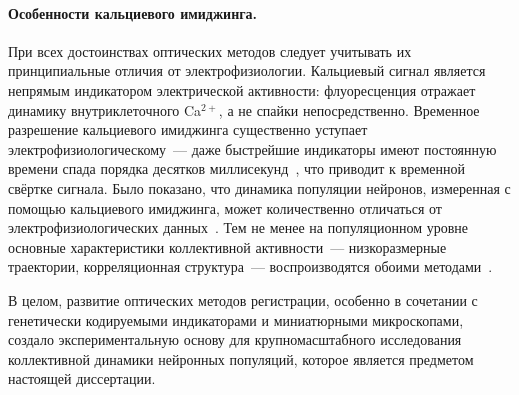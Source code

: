 \paragraph{Особенности кальциевого имиджинга.}
При всех достоинствах оптических методов следует учитывать их принципиальные отличия от электрофизиологии. Кальциевый сигнал является непрямым индикатором электрической активности: флуоресценция отражает динамику внутриклеточного Ca$^{2+}$, а не спайки непосредственно. Временное разрешение кальциевого имиджинга существенно уступает электрофизиологическому~--- даже быстрейшие индикаторы имеют постоянную времени спада порядка десятков миллисекунд~\cite{Zhang2023}, что приводит к временной свёртке сигнала. Было показано, что динамика популяции нейронов, измеренная с помощью кальциевого имиджинга, может количественно отличаться от электрофизиологических данных~\cite{Wei2020}. Тем не менее на популяционном уровне основные характеристики коллективной активности~--- низкоразмерные траектории, корреляционная структура~--- воспроизводятся обоими методами~\cite{Wei2020}.

В целом, развитие оптических методов регистрации, особенно в сочетании с генетически кодируемыми индикаторами и миниатюрными микроскопами, создало экспериментальную основу для крупномасштабного исследования коллективной динамики нейронных популяций, которое является предметом настоящей диссертации.
